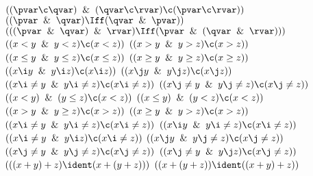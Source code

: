 %
%
$((\pvar \c \qvar) \And (\qvar \c \rvar) \c (\pvar \c \rvar))$
$((\pvar \And \qvar) \Iff (\qvar \And \pvar))$
$(((\pvar \And \qvar) \And \rvar) \Iff (\pvar \And (\qvar \And \rvar)))$
$((x < y \And y < z) \c (x < z))$
$((x > y \And y > z) \c (x > z))$
$((x \le  y \And y \le  z) \c (x \le  z))$
$((x \ge  y \And y \ge  z) \c (x \ge  z))$
$((x \i  y \And y \i  z) \c (x \i  z))$
$((x \j  y \And y \j  z) \c (x \j  z))$
$((x \i\ne  y \And y \i\ne  z) \c (x \i\ne  z))$
$((x \j\ne  y \And y \j\ne  z) \c (x \j\ne  z))$
$((x < y) \And (y \le z) \c (x < z))$
$((x \le y) \And (y < z) \c (x < z))$
$((x > y \And y \ge z) \c (x > z))$
$((x \ge y \And y > z) \c (x > z))$
$((x \i\ne  y \And y \i\ne  z) \c (x \i\ne  z))$
$((x \i  y \And y \i\ne  z) \c (x \i\ne  z))$
$((x \i\ne  y \And y \i  z) \c (x \i\ne  z))$
$((x \j  y \And y \j\ne  z) \c (x \j\ne  z))$
$((x \j\ne  y \And y \j\ne  z) \c (x \j\ne  z))$
$((x \j\ne  y \And y \j  z) \c (x \j\ne  z))$
$(((x + y) + z) \ident (x + (y + z)))$ 
$((x + (y + z)) \ident ((x + y) + z))$ 

